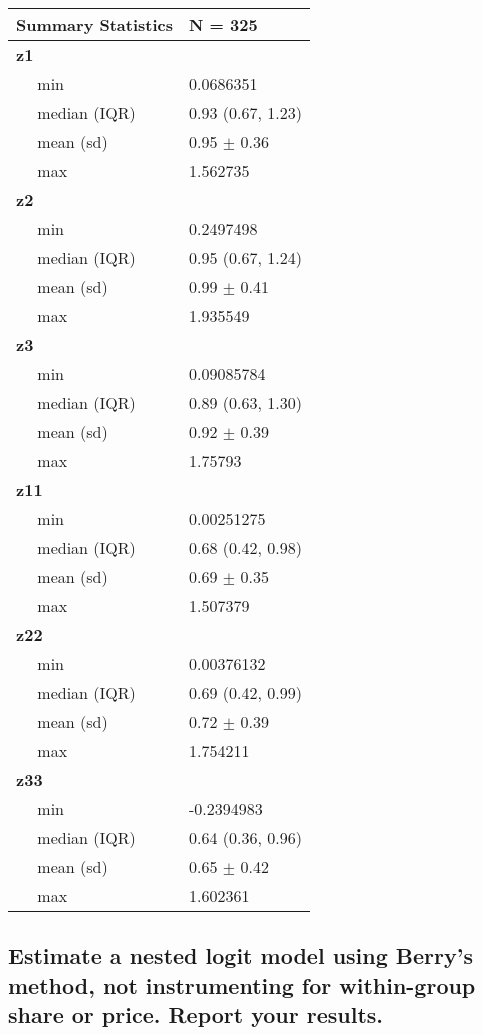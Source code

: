 \documentclass[]{article}
\begin{document}
\begin{tabular}{l|l}
\hline
Summary Statistics & N = 325\\
\hline
\bf{z1} & ~\\
\hline
~~ min & 0.0686351\\
\hline
~~ median (IQR) & 0.93 (0.67, 1.23)\\
\hline
~~ mean (sd) & 0.95 $\pm$ 0.36\\
\hline
~~ max & 1.562735\\
\hline
\bf{z2} & ~\\
\hline
~~ min & 0.2497498\\
\hline
~~ median (IQR) & 0.95 (0.67, 1.24)\\
\hline
~~ mean (sd) & 0.99 $\pm$ 0.41\\
\hline
~~ max & 1.935549\\
\hline
\bf{z3} & ~\\
\hline
~~ min & 0.09085784\\
\hline
~~ median (IQR) & 0.89 (0.63, 1.30)\\
\hline
~~ mean (sd) & 0.92 $\pm$ 0.39\\
\hline
~~ max & 1.75793\\
\hline
\bf{z11} & ~\\
\hline
~~ min & 0.00251275\\
\hline
~~ median (IQR) & 0.68 (0.42, 0.98)\\
\hline
~~ mean (sd) & 0.69 $\pm$ 0.35\\
\hline
~~ max & 1.507379\\
\hline
\bf{z22} & ~\\
\hline
~~ min & 0.00376132\\
\hline
~~ median (IQR) & 0.69 (0.42, 0.99)\\
\hline
~~ mean (sd) & 0.72 $\pm$ 0.39\\
\hline
~~ max & 1.754211\\
\hline
\bf{z33} & ~\\
\hline
~~ min & -0.2394983\\
\hline
~~ median (IQR) & 0.64 (0.36, 0.96)\\
\hline
~~ mean (sd) & 0.65 $\pm$ 0.42\\
\hline
~~ max & 1.602361\\
\hline
\end{tabular}

\hypertarget{estimate-a-nested-logit-model-using-berrys-method-not-instrumenting-for-within-group-share-or-price.-report-your-results.}{%
\subsection{Estimate a nested logit model using Berry's method, not
instrumenting for within-group share or price. Report your
results.}\label{estimate-a-nested-logit-model-using-berrys-method-not-instrumenting-for-within-group-share-or-price.-report-your-results.}}
\end{document}

